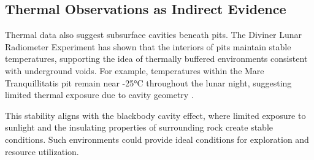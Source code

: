 \subsection{Thermal Observations as Indirect Evidence}

Thermal data also suggest subsurface cavities beneath pits. The Diviner Lunar Radiometer Experiment has shown that the interiors of pits maintain stable temperatures, supporting the idea of thermally buffered environments consistent with underground voids. For example, temperatures within the Mare Tranquillitatis pit remain near -25°C throughout the lunar night, suggesting limited thermal exposure due to cavity geometry \citep{thermal-lunar-pits, newer-thermal}.

This stability aligns with the blackbody cavity effect, where limited exposure to sunlight and the insulating properties of surrounding rock create stable conditions. Such environments could provide ideal conditions for exploration and resource utilization.